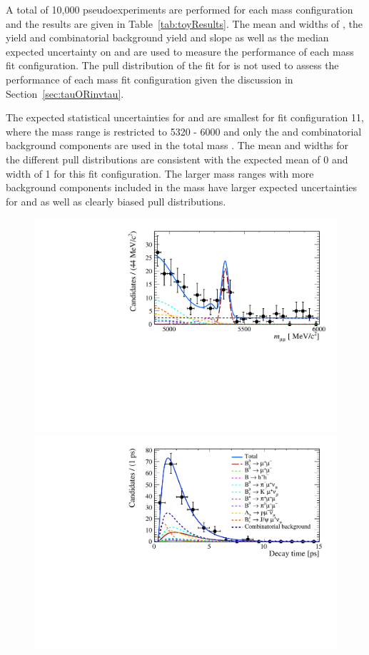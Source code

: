 {A total of 10,000 pseudoexperiments are performed for each mass configuration and the results are given in Table~\ref{tab:toyResults}. The mean and widths of \Gmumu, the \bsmumu yield and combinatorial background yield and slope as well as the median expected uncertainty on \tmumu and \Gmumu are used to measure the performance of each mass fit configuration. The pull distribution of the fit for \tmumu is not used to assess the performance of each mass fit configuration given the discussion in Section~\ref{sec:tauORinvtau}.



The expected statistical uncertainties for \tmumu and \Gmumu are smallest for fit configuration 11, where the mass range is restricted to 5320 - 6000 \mevcc and only the \bsmumu and combinatorial background components are used in the total mass \pdf. The mean and widths for the different pull distributions are consistent with the expected mean of 0 and width of 1 for this fit configuration. The larger mass ranges with more background components included in the mass \pdf have larger expected uncertainties for \tmumu and \Gmumu as well as clearly biased pull distributions. %

\begin{figure}[hp]
    \centering
        \includegraphics[width= 0.8 \textwidth]{./Figs/LifetimeMeasurement/mass_pdf2.pdf}
        \includegraphics[width= 0.8 \textwidth]{./Figs/LifetimeMeasurement/DT_pdf2.pdf}
 

\end{figure}}
